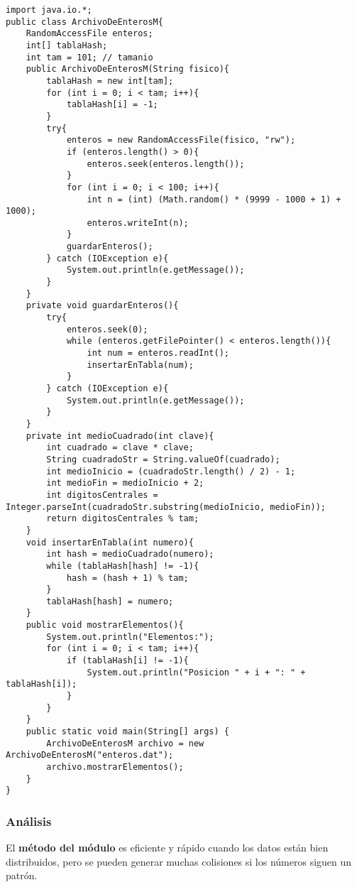 \documentclass{scrreprt}
\begin{document}
\begin{lstlisting}[style=java]
import java.io.*;
public class ArchivoDeEnterosM{
    RandomAccessFile enteros;
    int[] tablaHash;
    int tam = 101; // tamanio
    public ArchivoDeEnterosM(String fisico){
        tablaHash = new int[tam];
        for (int i = 0; i < tam; i++){
            tablaHash[i] = -1;
        }
        try{
            enteros = new RandomAccessFile(fisico, "rw");
            if (enteros.length() > 0){
                enteros.seek(enteros.length());
            }
            for (int i = 0; i < 100; i++){
                int n = (int) (Math.random() * (9999 - 1000 + 1) + 1000);
                enteros.writeInt(n);
            }
            guardarEnteros();
        } catch (IOException e){
            System.out.println(e.getMessage());
        }
    }
    private void guardarEnteros(){
        try{
            enteros.seek(0);
            while (enteros.getFilePointer() < enteros.length()){
                int num = enteros.readInt();
                insertarEnTabla(num);
            }
        } catch (IOException e){
            System.out.println(e.getMessage());
        }
    }
    private int medioCuadrado(int clave){
        int cuadrado = clave * clave;
        String cuadradoStr = String.valueOf(cuadrado);
        int medioInicio = (cuadradoStr.length() / 2) - 1;
        int medioFin = medioInicio + 2;
        int digitosCentrales = Integer.parseInt(cuadradoStr.substring(medioInicio, medioFin));
        return digitosCentrales % tam;
    }
    void insertarEnTabla(int numero){
        int hash = medioCuadrado(numero);
        while (tablaHash[hash] != -1){
            hash = (hash + 1) % tam;
        }
        tablaHash[hash] = numero;
    }
    public void mostrarElementos(){
        System.out.println("Elementos:");
        for (int i = 0; i < tam; i++){
            if (tablaHash[i] != -1){
                System.out.println("Posicion " + i + ": " + tablaHash[i]);
            }
        }
    }
    public static void main(String[] args) {
        ArchivoDeEnterosM archivo = new ArchivoDeEnterosM("enteros.dat");
        archivo.mostrarElementos();
    }
}
\end{lstlisting}
\subsubsection{Análisis}
El \textbf{método del módulo} es eficiente y rápido cuando los datos están bien distribuidos, pero se pueden generar muchas colisiones si los números siguen un patrón.
\end{document}
